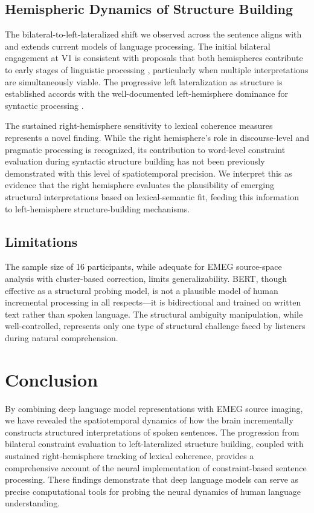 \documentclass[12pt]{article}
\begin{document}
\subsection{Hemispheric Dynamics of Structure Building}

The bilateral-to-left-lateralized shift we observed across the sentence aligns with and extends current models of language processing. The initial bilateral engagement at V1 is consistent with proposals that both hemispheres contribute to early stages of linguistic processing \citep{hickok2007cortical}, particularly when multiple interpretations are simultaneously viable. The progressive left lateralization as structure is established accords with the well-documented left-hemisphere dominance for syntactic processing \citep{friederici2011brain, hagoort2005broca}.

The sustained right-hemisphere sensitivity to lexical coherence measures represents a novel finding. While the right hemisphere's role in discourse-level and pragmatic processing is recognized, its contribution to word-level constraint evaluation during syntactic structure building has not been previously demonstrated with this level of spatiotemporal precision. We interpret this as evidence that the right hemisphere evaluates the plausibility of emerging structural interpretations based on lexical-semantic fit, feeding this information to left-hemisphere structure-building mechanisms.

\subsection{Limitations}

The sample size of 16 participants, while adequate for EMEG source-space analysis with cluster-based correction, limits generalizability. BERT, though effective as a structural probing model, is not a plausible model of human incremental processing in all respects---it is bidirectional and trained on written text rather than spoken language. The structural ambiguity manipulation, while well-controlled, represents only one type of structural challenge faced by listeners during natural comprehension.

\section{Conclusion}

By combining deep language model representations with EMEG source imaging, we have revealed the spatiotemporal dynamics of how the brain incrementally constructs structured interpretations of spoken sentences. The progression from bilateral constraint evaluation to left-lateralized structure building, coupled with sustained right-hemisphere tracking of lexical coherence, provides a comprehensive account of the neural implementation of constraint-based sentence processing. These findings demonstrate that deep language models can serve as precise computational tools for probing the neural dynamics of human language understanding.



\end{document}
